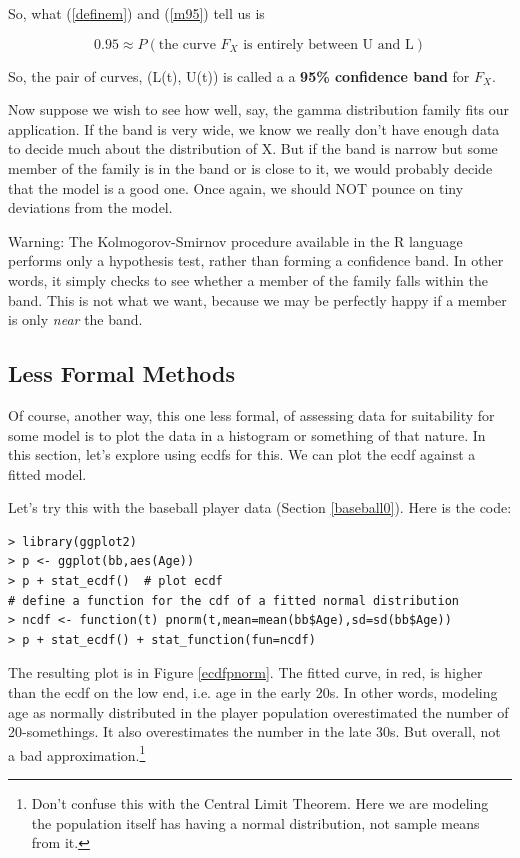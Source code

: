 So, what (\ref{definem}) and (\ref{m95}) tell us is

\begin{equation}
0.95 \approx P \left (\textrm{the curve } F_X \textrm{ is entirely between U
and L} \right ) 
\end{equation}

So, the pair of curves, (L(t), U(t)) is called a a {\bf 95\% confidence
band} for $F_X$. 

Now suppose we wish to see how well, say, the gamma distribution family
fits our application.  If the band is very wide, we know we really don't
have enough data to decide much about the distribution of X.  But if the
band is narrow but some member of the family is in the band or is close
to it, we would probably decide that the model is a good one.  Once
again, we should NOT pounce on tiny deviations from the model.

Warning:  The Kolmogorov-Smirnov procedure available in
the R language performs only a hypothesis test, rather than forming a
confidence band.  In other words, it simply checks to see whether a
member of the family falls within the band.  This is not what we want,
because we may be perfectly happy if a member is only {\it near} the
band.


\subsection{Less Formal Methods}

Of course, another way, this one less formal, of assessing data for
suitability for some model is to plot the data in a histogram or
something of that nature.  In this section, let's explore using ecdfs
for this.  We can plot the ecdf against a fitted model.

Let's try this with the baseball player data (Section \ref{baseball0}).
Here is the code:

\begin{lstlisting}
> library(ggplot2)
> p <- ggplot(bb,aes(Age))
> p + stat_ecdf()  # plot ecdf 
# define a function for the cdf of a fitted normal distribution 
> ncdf <- function(t) pnorm(t,mean=mean(bb$Age),sd=sd(bb$Age))
> p + stat_ecdf() + stat_function(fun=ncdf)
\end{lstlisting}

The resulting plot is in Figure \ref{ecdfpnorm}.  The fitted curve, in
red, is higher than the ecdf on the low end, i.e. age in the early 20s.
In other words, modeling age as normally distributed in the player
population overestimated the number of 20-somethings.  It also
overestimates the number in the late 30s.  But overall, not a bad
approximation.\footnote{Don't confuse this with the Central Limit
Theorem.  Here we are modeling the population itself has having a normal
distribution, not sample means from it.}


